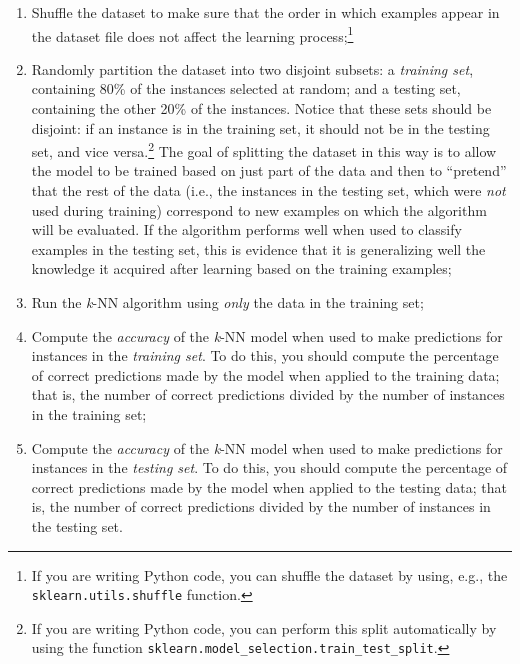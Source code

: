 \documentclass{article}
\begin{document}
\begin{enumerate}
    \item Shuffle the dataset to make sure that the order in which examples appear in the dataset file does not affect the learning process;\footnote{If you are writing Python code, you can shuffle the dataset by using, e.g., the \texttt{sklearn.utils.shuffle} function.}
    \item Randomly partition the dataset into two disjoint subsets: a \textit{training set}, containing 80\% of the instances selected at random; and a testing set, containing the other 20\% of the instances. Notice that these sets should be disjoint: if an instance is in the training set, it should not be in the testing set, and vice versa.\footnote{If you are writing Python code, you can perform this split automatically by using the function \texttt{sklearn.model\_selection.train\_test\_split}.} The goal of splitting the dataset in this way is to allow the model to be trained based on just part of the data and then to ``pretend'' that the rest of the data (i.e., the instances in the testing set, which were \textit{not} used during training) correspond to new examples on which the algorithm will be evaluated. If the algorithm performs well when used to classify examples in the testing set, this is evidence that it is generalizing well the knowledge it acquired after learning based on the training examples;
    \item Run the \textit{k}-NN algorithm using \textit{only} the data in the training set;
    \item Compute the \textit{accuracy} of the \textit{k}-NN model when used to make predictions for instances in the \textit{training set}. To do this, you should compute the percentage of correct predictions made by the model when applied to the training data; that is, the number of correct predictions divided by the number of instances in the training set;
    \item Compute the \textit{accuracy} of the \textit{k}-NN model when used to make predictions for instances in the \textit{testing set}. To do this, you should compute the percentage of correct predictions made by the model when applied to the testing data; that is, the number of correct predictions divided by the number of instances in the testing set. 
\end{enumerate}

\begin{mybox}[boxpink] 
\end{mybox}
\vspace{0.15in}
\end{document}
